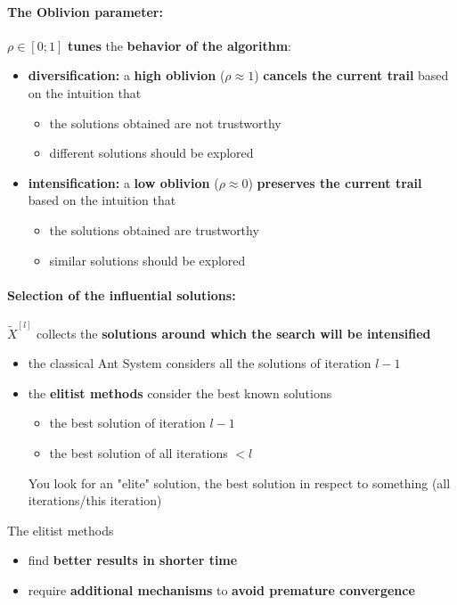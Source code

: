 \documentclass[11pt]{article}
\begin{document}
	\paragraph{The Oblivion parameter:} $\rho \in [0; 1]$ \textbf{tunes} the \textbf{behavior of the algorithm}:
	\begin{itemize}
		\item \textbf{diversification:} a \textbf{high oblivion} ($\rho \approx 1$) \textbf{cancels the current trail} based on the intuition that
		\begin{itemize}
			\item the solutions obtained are not trustworthy
			\item different solutions should be explored
		\end{itemize}
		
		\item \textbf{intensification:} a \textbf{low oblivion} ($\rho \approx 0$) \textbf{preserves the current trail} based on the intuition that
		\begin{itemize}
			\item the solutions obtained are trustworthy
			\item similar solutions should be explored
		\end{itemize}
	\end{itemize}
	\nn
	
	\paragraph{Selection of the influential solutions:} $\tilde{X}^{[l]}$ collects the \textbf{solutions around which the search will be intensified}
	\begin{itemize}
		\item the classical Ant System considers all the solutions of iteration $l - 1$
		
		\item the \textbf{elitist methods} consider the best known solutions
		\begin{itemize}
			\item the best solution of iteration $l - 1$
			\item the best solution of all iterations $< l$
		\end{itemize}
		You look for an "elite" solution, the best solution in respect to something (all iterations/this iteration)
	\end{itemize}
	
	The elitist methods
	\begin{itemize}
		\item find \textbf{better results in shorter time}
		
		\item require \textbf{additional mechanisms} to \textbf{avoid premature convergence}
	\end{itemize}
	\nn
	
\end{document}
